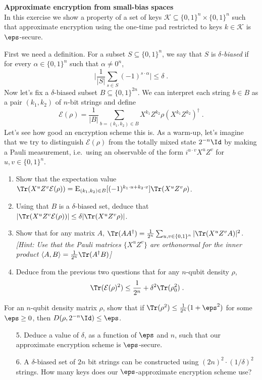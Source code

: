 \newcommand{\Es}[1]{\ensuremath{\mathop{\textsc{E}}}_{#1}}


\chapter{}

\begin{exercises}

\item {\bf Approximate encryption from small-bias spaces}\\
In this exercise we show a property of a set of keys $\mathcal{K}\subseteq \{0,1\}^n \times \{0,1\}^n$ such that approximate encryption using the one-time pad restricted to keys $k\in\mathcal{K}$ is $\eps$-secure. 

First we need a definition. For a subset $S\subseteq\{0,1\}^n$, we say that $S$ is \emph{$\delta$-biased} if for every $\alpha\in \{0,1\}^n$ such that $\alpha\neq 0^n$,
\[ \Big|\frac{1}{|S|} \sum_{s\in S} (-1)^{s\cdot \alpha} \Big| \leq \delta\;.\]
Now let's fix a $\delta$-biased subset $B\subseteq \{0,1\}^{2n}$. We can interpret each string $b\in B$ as a pair $(k_1,k_2)$ of $n$-bit strings and define 
\[ \mathcal{E}(\rho) = \frac{1}{|B|} \sum_{b=(k_1,k_2)\in B} X^{k_1} Z^{k_2} \rho (X^{k_1} Z^{k_2})^\dagger\;.\]
Let's see how good an encryption scheme this is. As a warm-up, let's imagine that we try to distinguish $\mathcal{E}(\rho)$ from the totally mixed state $2^{-n}\Id$ by making a Pauli measurement, i.e.\ using an observable of the form $i^{u\cdot v} X^uZ^v$ for $u,v\in \{0,1\}^n$. 
\begin{enumerate}
\item Show that the expectation value $\Tr(X^uZ^v \mathcal{E}(\rho)) = \Es{(k_1,k_2)\in B}[(-1)^{k_1\cdot u + k_2\cdot v}]\Tr(X^uZ^v\rho)$.
\item Using that $B$ is a $\delta$-biased set, deduce that $|\Tr(X^u Z^v \mathcal{E}(\rho))|\leq \delta |\Tr(X^u Z^v \rho)|$. 
\item Show that for any matrix $A$, $\Tr(AA^\dagger) = \frac{1}{2^n} \sum_{u,v\in \{0,1\}^n} |\Tr(X^uZ^v A)|^2$. \emph{[Hint: Use that the Pauli matrices $\{X^uZ^v\}$ are orthonormal for the inner product $\langle A,B\rangle=\frac{1}{2^n} \Tr(A^\dagger B)$]}
\item Deduce from the previous two questions that for any $n$-qubit density $\rho$, 
\[ \Tr(\mathcal{E}(\rho)^2) \leq \frac{1}{2^n} + \delta^2 \Tr(\rho_0^2)\;.\]
\end{enumerate}
For an $n$-qubit density matrix $\rho$, show that if $\Tr(\rho^2)\leq \frac{1}{2^n}(1+\eps^2)$ for some $\eps\geq 0$, then $D(\rho,2^{-n}\Id)\leq \eps$. 
\begin{enumerate}
\item[5.] Deduce a value of $\delta$, as a function of $\eps$ and $n$, such that our approximate encryption scheme is $\eps$-secure. 
\item[6.] A $\delta$-biased set of $2n$ bit strings can be constructed using $(2n)^2 \cdot (1/\delta)^2$ strings. How many keys does our $\eps$-approximate encryption scheme use? 
\end{enumerate}



\end{exercises}
